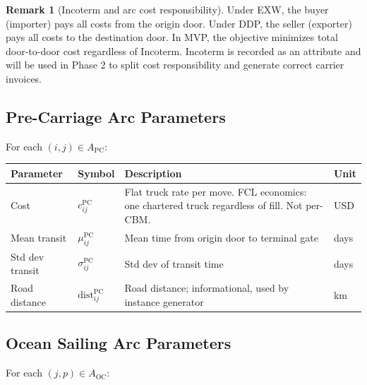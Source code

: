 \documentclass[11pt,a4paper]{article}
\theoremstyle{definition}
\newtheorem{remark}{Remark}
\begin{document}
\begin{remark}[Incoterm and arc cost responsibility]
Under EXW, the buyer (importer) pays all costs from the origin door.
Under DDP, the seller (exporter) pays all costs to the destination door.
In MVP, the objective minimizes total door-to-door cost regardless of Incoterm.
Incoterm is recorded as an attribute and will be used in Phase 2 to split cost
responsibility and generate correct carrier invoices.
\end{remark}

\subsection{Pre-Carriage Arc Parameters}

For each $(i, j) \in A_{\text{PC}}$:

\begin{center}
\begin{tabular}{llp{6.5cm}l}
\toprule
Parameter & Symbol & Description & Unit \\
\midrule
Cost & $c_{ij}^{\text{PC}}$ & Flat truck rate per move. FCL economics: one chartered truck regardless of fill. Not per-CBM. & USD \\
Mean transit & $\mu_{ij}^{\text{PC}}$ & Mean time from origin door to terminal gate & days \\
Std dev transit & $\sigma_{ij}^{\text{PC}}$ & Std dev of transit time & days \\
Road distance & $\text{dist}_{ij}^{\text{PC}}$ & Road distance; informational, used by instance generator & km \\
\bottomrule
\end{tabular}
\end{center}

\subsection{Ocean Sailing Arc Parameters}

For each $(j, p) \in A_{\text{OC}}$:
\end{document}
